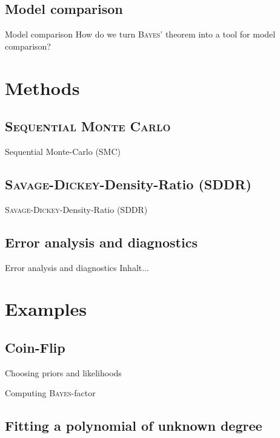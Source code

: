 \documentclass[11pt,aspectratio=1610,dvipsnames]{beamer}
\begin{document}
\subsection{Model comparison}
\begin{frame}{Model comparison}
	How do we turn \textsc{Bayes'} theorem into a tool for model comparison?
\end{frame}

\section{Methods}

\subsection{\textsc{Sequential Monte Carlo}}
\begin{frame}{Sequential Monte-Carlo (SMC)}
\end{frame}

\subsection{\textsc{Savage-Dickey}-Density-Ratio (SDDR)}
\begin{frame}{\textsc{Savage-Dickey}-Density-Ratio (SDDR)}
\end{frame}
\subsection{Error analysis and diagnostics}
\begin{frame}{Error analysis and diagnostics}
	Inhalt...
\end{frame}

\section{Examples}

\subsection{Coin-Flip}
\begin{frame}{Choosing priors and likelihoods}
	
\end{frame}

\begin{frame}{Computing \textsc{Bayes}-factor}
	
\end{frame}
\subsection{Fitting a polynomial of unknown degree}
\end{document}
